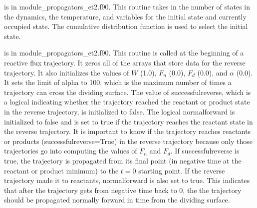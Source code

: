 \documentclass[aps,amsfonts,amsmath,amssymb,onecolumn,tightenlines,notitlepage]{revtex4-2}
\begin{document}
\vspace{0.5cm}
 is in {\ttfamily module\_propagators\_et2.f90}. This routine takes in the number of states in the dynamics, the temperature, and variables for the initial state and currently occupied state. The cumulative distribution function is used to select the initial state.

\vspace{0.5cm}
 is in {\ttfamily module\_propagators\_et2.f90}. This routine is called at the beginning of a reactive flux trajectory.  It zeros all of the arrays that store data for the reverse trajectory.  It also initializes the values of $W$ (1.0), $F_n$ (0.0), $F_d$ (0.0), and $\alpha$ (0.0). It sets the limit of alpha to 100, which is the maximum number of times a trajectory can cross the dividing surface. The value of {\ttfamily successfulreverse}, which is a logical indicating whether the trajectory reached the reactant or product state in the reverse trajectory, is initialized to {\ttfamily false}. The logical {\ttfamily normalforward} is initialized to false and is set to true if the trajectory reaches the reactant state in the reverse trajectory. It is important to know if the trajectory reaches reactants or products ({\ttfamily successfulreverse=True}) in the reverse trajectory because only those trajectories go into computing the values of $F_n$ and $F_d$. If {\ttfamily successfulreverse} is true, the trajectory is propagated from its final point (in negative time at the reactant or product minimum) to the $t=0$ starting point. If the reverse trajectory made it to reactants, {\ttfamily normalforward} is also set to {\ttfamily true}. This indicates that after the trajectory gets from negative time back to 0, the the trajectory should be propagated normally forward in time from the dividing surface.
\end{document}
